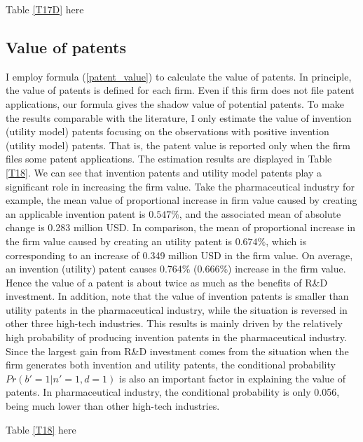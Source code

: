 \documentclass[English]{article}
\begin{document}
\begin{center}
Table \ref{T17D} here
\end{center}

\subsection{Value of patents}
I employ formula (\ref{patent_value}) to calculate the value of patents. In principle, the value of patents is defined for each firm. Even if this firm does not file patent applications, our formula gives the shadow value of potential patents. To make the results comparable with the literature, I only estimate the value of invention (utility model) patents focusing on the observations with positive invention (utility model) patents. That is, the patent value is reported only when the firm files some patent applications. The estimation results are displayed in Table \ref{T18}. We can see that invention patents and utility model patents play a significant role in increasing the firm value. Take the pharmaceutical industry for example, the mean value of proportional increase in firm value caused by creating an applicable invention patent is $0.547\%$, and the associated mean of absolute change is 0.283 million USD. In comparison, the mean of proportional increase in the firm value caused by creating an utility patent is $0.674\%$, which is corresponding to an increase of 0.349 million USD in the firm value. On average, an invention (utility) patent causes 0.764\% (0.666\%) increase in the firm value. Hence the value of a patent is about twice as much as the benefits of R\&D investment. In addition, note that the value of invention patents is smaller than utility patents in the pharmaceutical industry, while the situation is reversed in other three high-tech industries. This results is mainly driven by the relatively high probability of producing invention patents in the pharmaceutical industry. Since the largest gain from R\&D investment comes from the situation when the firm generates both invention and utility patents, the conditional probability $Pr(b'=1|n'=1,d=1)$ is also an important factor in explaining the value of patents. In pharmaceutical industry, the conditional probability is only 0.056, being much lower than other high-tech industries. 

\begin{center}
Table \ref{T18} here
\end{center}
\end{document}
